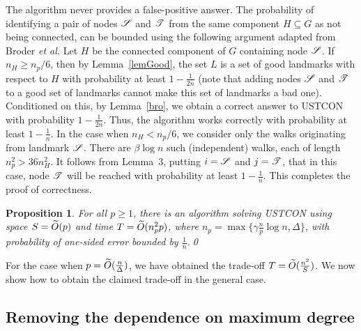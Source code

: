 \documentclass[11pt,a4paper]{article}
\newtheorem{proposition}{Proposition}
\newcommand{\Broder}{Broder \etal}
\newcommand{\etal}{\textsl{et al.}\xspace}
\renewcommand{\O}{\ensuremath \widetilde O}
\newcommand{\s}{\ensuremath  \mathscr S}
\renewcommand{\t}{\ensuremath \mathscr  T}
\renewcommand{\*}{\hspace*{5mm}}
\begin{document}
The algorithm never provides a false-positive answer. The probability of identifying a pair of nodes $\s$ and $\t$ from the same component $H\subseteq G$ as not being connected, can be bounded using the following argument adapted from \Broder Let $H$ be the connected component of $G$ containing node $\s$. If $n_H \geq n_p / 6$, then by Lemma~\ref{lemGood}, the set $L$ is a set of good landmarks with respect to $H$ with probability at least $1-\frac{1}{2n}$ (note that adding nodes $\s$ and $\t$ to a good set of landmarks cannot make this set of landmarks a bad one). Conditioned on this, by Lemma~\ref{bro}, we obtain a correct answer to USTCON with probability $1-\frac{1}{2n}$. Thus, the algorithm works correctly with probability at least $1-\frac{1}{n}$. In the case when $n_H < n_p / 6$, we consider only the walks originating from landmark $\s$. There are $\beta \log n$ such (independent) walks, each of length $n_p^2 > 36 n_H^2$. It follows from Lemma~3, putting $i = \s$ and $j = \t$, that in this case, node $\t$ will be reached with probability at least $1 - \frac{1}{n}$. This completes the proof of correctness.

\begin{proposition}
For all $p\geq 1$, there is an algorithm solving USTCON using space $S = \O(p)$ and time $T=\O(n_p^2 p)$, where $n_p = \max\{\gamma \frac{n}{p} \log n, \Delta\}$, with probability of one-sided error bounded by $\frac{1}{n}$.\qed
\end{proposition}

For the case when $p = \O(\frac{n}{\Delta})$, we have obtained the trade-off $T = \O(\frac{n^2}{S})$. We now show how to obtain the claimed trade-off in the general case.

\subsection{Removing the dependence on maximum degree}\label{sec32}
\end{document}

